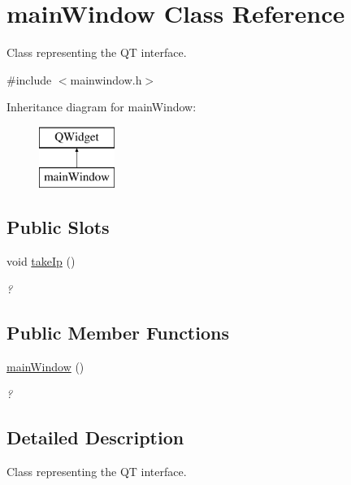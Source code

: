 \hypertarget{classmain_window}{}\section{main\+Window Class Reference}
\label{classmain_window}


Class representing the QT interface.  




{\ttfamily \#include $<$mainwindow.\+h$>$}

Inheritance diagram for main\+Window\+:\begin{figure}[H]
\begin{center}
\leavevmode
\includegraphics[height=2.000000cm]{classmain_window}
\end{center}
\end{figure}
\subsection*{Public Slots}
\begin{DoxyCompactItemize}
\item 
void \hyperlink{classmain_window_ae38f3474108e081d12b5c2bafd09714b}{take\+Ip} ()
\begin{DoxyCompactList}\small\item\em ? \end{DoxyCompactList}\end{DoxyCompactItemize}
\subsection*{Public Member Functions}
\begin{DoxyCompactItemize}
\item 
\hyperlink{classmain_window_a467ea0d8090c122e5b5fd69f77ed3476}{main\+Window} ()
\begin{DoxyCompactList}\small\item\em ? \end{DoxyCompactList}\end{DoxyCompactItemize}


\subsection{Detailed Description}
Class representing the QT interface. 

